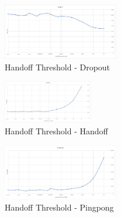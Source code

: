 \documentclass[a4paper]{IEEEtran}
\begin{document}
\begin{figure}[h]
    \includegraphics[width=0.45\textwidth]{handoffthreshold/dropout}
    \caption{Handoff Threshold - Dropout}
    \label{fig:mesh1}
\end{figure}
\begin{figure}[h]
    \includegraphics[width=0.35\textwidth]{handoffthreshold/handoff}
    \caption{Handoff Threshold - Handoff}
    \label{fig:mesh2}
\end{figure}
\begin{figure}[h]
    \includegraphics[width=0.45\textwidth]{handoffthreshold/pingpong}
    \caption{Handoff Threshold - Pingpong}
    \label{fig:mesh3}
\end{figure}
\end{document}
